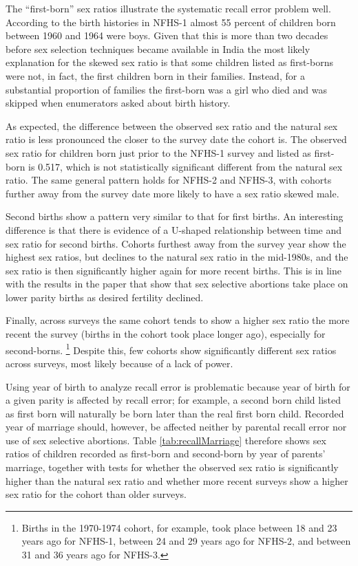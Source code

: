 \documentclass[12pt,letterpaper]{article}
\begin{document}
The ``first-born'' sex ratios illustrate the systematic recall error problem well. 
According to the birth histories in NFHS-1 almost 55 percent of children born between 1960 
and 1964 were boys.
Given that this is more than two decades before sex selection techniques became available
in India the most likely explanation for the skewed sex ratio is that some children
listed as first-borns were not, in fact, the first children born in their families.
Instead, for a substantial proportion of families the first-born was a girl who died and was 
skipped when enumerators asked about birth history.

As expected, the difference between the observed sex ratio and the natural sex ratio is 
less pronounced the closer to the survey date the cohort is.
The observed sex ratio for children born just prior to the NFHS-1 survey and listed as 
first-born is 0.517, which is not statistically significant different from the
natural sex ratio.
The same general pattern holds for NFHS-2 and NFHS-3, with cohorts further away
from the survey date more likely to have a sex ratio skewed male.

Second births show a pattern very similar to that for first births.
An interesting difference is that there is evidence of a U-shaped relationship between
time and sex ratio for second births.
Cohorts furthest away from the survey year show the highest sex ratios, but declines to the
natural sex ratio in the mid-1980s, and the sex ratio is then significantly higher again 
for more recent births.
This is in line with the results in the paper that show that sex selective abortions take 
place on lower parity births as desired fertility declined.

Finally, across surveys the same cohort tends to show a higher sex ratio the more recent 
the survey (births in the cohort took place longer ago), especially for second-borns.%
\footnote{
Births in the 1970-1974 cohort, for example, took place
between 18 and 23 years ago for NFHS-1, 
between 24 and 29 years ago for NFHS-2,
and  between 31 and 36 years ago for NFHS-3.
}
Despite this, few cohorts show significantly different sex ratios across surveys, most 
likely because of a lack of power.

Using year of birth to analyze recall error is problematic because year of birth for a 
given parity is affected by recall error; for example, a second born child listed as first 
born will naturally be born later than the real first born child.
Recorded year of marriage should, however, be affected neither by parental recall error 
nor use of sex selective abortions.
Table \ref{tab:recallMarriage} therefore shows sex ratios of children recorded as 
first-born and second-born by year of parents'
marriage, together with tests for whether the observed sex ratio is
significantly higher than the natural sex ratio and whether more recent surveys show
a higher sex ratio for the cohort than older surveys.
\end{document}
